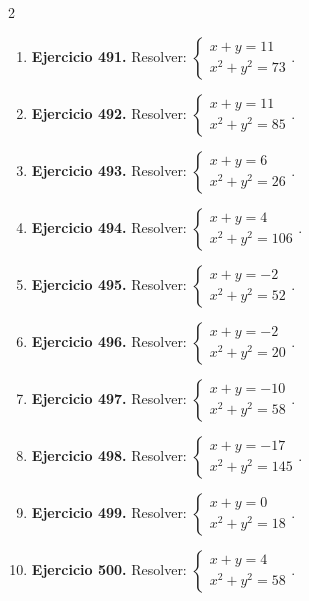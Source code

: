 \documentclass[10pt,a4paper]{article}
\begin{document}
\begin{multicols}{2}
\begin{enumerate}[label=\textbf{\arabic*.}]
\item \textbf{Ejercicio 491.} Resolver: \(\begin{cases}x+y=11\\x^2+y^2=73\end{cases}\).
\item \textbf{Ejercicio 492.} Resolver: \(\begin{cases}x+y=11\\x^2+y^2=85\end{cases}\).
\item \textbf{Ejercicio 493.} Resolver: \(\begin{cases}x+y=6\\x^2+y^2=26\end{cases}\).
\item \textbf{Ejercicio 494.} Resolver: \(\begin{cases}x+y=4\\x^2+y^2=106\end{cases}\).
\item \textbf{Ejercicio 495.} Resolver: \(\begin{cases}x+y=-2\\x^2+y^2=52\end{cases}\).
\item \textbf{Ejercicio 496.} Resolver: \(\begin{cases}x+y=-2\\x^2+y^2=20\end{cases}\).
\item \textbf{Ejercicio 497.} Resolver: \(\begin{cases}x+y=-10\\x^2+y^2=58\end{cases}\).
\item \textbf{Ejercicio 498.} Resolver: \(\begin{cases}x+y=-17\\x^2+y^2=145\end{cases}\).
\item \textbf{Ejercicio 499.} Resolver: \(\begin{cases}x+y=0\\x^2+y^2=18\end{cases}\).
\item \textbf{Ejercicio 500.} Resolver: \(\begin{cases}x+y=4\\x^2+y^2=58\end{cases}\).
\end{enumerate}
\end{multicols}
\newpage
\end{document}
